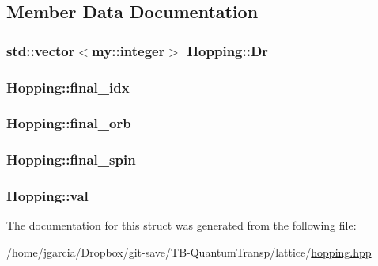 \subsection{Member Data Documentation}
\hypertarget{structHopping_a2f0da903b2ac12160e7cf1d3c0e35e06}{
\subsubsection[{Dr}]{\setlength{\rightskip}{0pt plus 5cm}std\+::vector$<${\bf my\+::integer}$>$ Hopping\+::\+Dr}}\label{structHopping_a2f0da903b2ac12160e7cf1d3c0e35e06}
\hypertarget{structHopping_a1b55db9de9a4db775f0c2b657298a09d}{
\subsubsection[{final\+\_\+idx}]{ Hopping\+::final\+\_\+idx}}\label{structHopping_a1b55db9de9a4db775f0c2b657298a09d}
\hypertarget{structHopping_ad1166a9ebbb8c6a1162730849bf4a5e1}{
\subsubsection[{final\+\_\+orb}]{ Hopping\+::final\+\_\+orb}}\label{structHopping_ad1166a9ebbb8c6a1162730849bf4a5e1}
\hypertarget{structHopping_a5cc2d510da7ee8507e4a65f1fb72ddca}{
\subsubsection[{final\+\_\+spin}]{ Hopping\+::final\+\_\+spin}}\label{structHopping_a5cc2d510da7ee8507e4a65f1fb72ddca}
\hypertarget{structHopping_a90017ad9f5dbd382ae1d84b5981dd93a}{
\subsubsection[{val}]{ Hopping\+::val}}\label{structHopping_a90017ad9f5dbd382ae1d84b5981dd93a}


The documentation for this struct was generated from the following file\+:\begin{DoxyCompactItemize}
\item 
/home/jgarcia/\+Dropbox/git-\/save/\+T\+B-\/\+Quantum\+Transp/lattice/\hyperlink{hopping_8hpp}{hopping.\+hpp}\end{DoxyCompactItemize}

